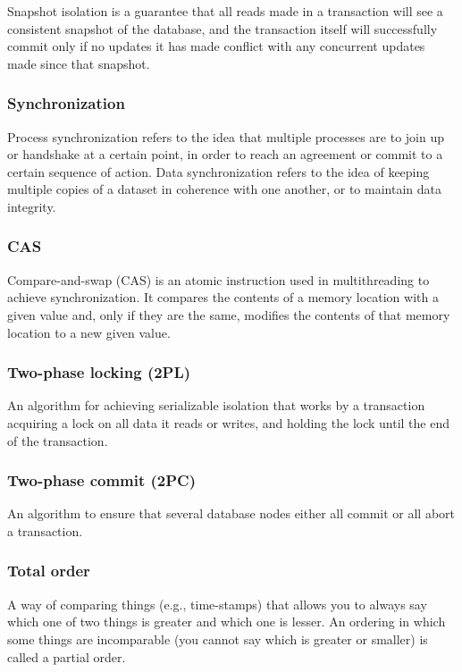 \documentclass{article}
\begin{document}
    Snapshot isolation is a guarantee that all reads made in a transaction will see a consistent snapshot of the database, and the transaction itself will successfully commit only if no updates it has made conflict with any concurrent updates made since that snapshot.
    
    \subsubsection{Synchronization}
    Process synchronization refers to the idea that multiple processes are to join up or handshake at a certain point, in order to reach an agreement or commit to a certain sequence of action. Data synchronization refers to the idea of keeping multiple copies of a dataset in coherence with one another, or to maintain data integrity.
    
    \subsubsection{CAS}
    Compare-and-swap (CAS) is an atomic instruction used in multithreading to achieve synchronization. It compares the contents of a memory location with a given value and, only if they are the same, modifies the contents of that memory location to a new given value.
    
    \subsubsection{Two-phase locking (2PL)}
    An algorithm for achieving serializable isolation that works by a transaction acquiring a lock on all data it reads or writes, and holding the lock until the end of the transaction.
    
    \subsubsection{Two-phase commit (2PC)}
    An algorithm to ensure that several database nodes either all commit or all abort a transaction.
    
    \subsubsection{Total order}
    A way of comparing things (e.g., time-stamps) that allows you to always say which one of two things is greater and which one is lesser. An ordering in which some things are incomparable (you cannot say which is greater or smaller) is called a partial order.
    
\end{document}
